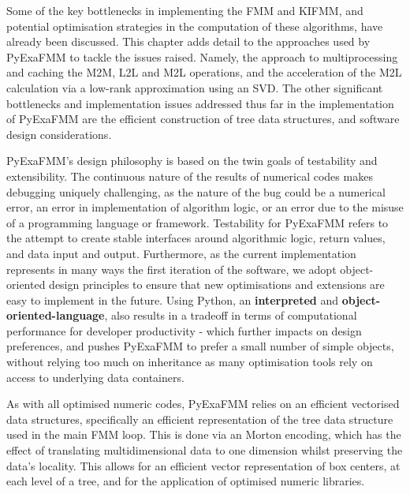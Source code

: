 Some of the key bottlenecks in implementing the \gls{FMM} and \gls{KIFMM}, and potential
optimisation strategies in the computation of these algorithms, have already been
discussed. This chapter adds detail to the approaches used by \gls{PyExaFMM} to tackle
the issues raised. Namely, the approach to multiprocessing and caching the \gls{M2M},
\gls{L2L} and \gls{M2L} operations, and the acceleration of the \gls{M2L} calculation
via a low-rank approximation using an \gls{SVD}. The other significant bottlenecks
and implementation issues addressed thus far in the implementation of \gls{PyExaFMM} are the
efficient construction of tree data structures, and software design considerations.

\gls{PyExaFMM}'s design philosophy is based on the twin goals of testability
and extensibility. The continuous nature of the results of numerical codes makes
debugging uniquely challenging, as the nature of the bug could be a numerical error,
an error in implementation of algorithm logic, or an error due to the misuse of a
programming language or framework. Testability for \gls{PyExaFMM} refers to
the attempt to create stable interfaces around algorithmic logic, return values,
and data input and output. Furthermore, as the current implementation represents
in many ways the first iteration of the software, we adopt object-oriented
design principles to ensure that new optimisations and extensions are easy
to implement in the future. Using Python, an \textbf{\gls{interpreted}} and
\textbf{\gls{object-oriented-language}}, also results in a tradeoff in terms of
computational performance for developer productivity - which further impacts
on design preferences, and pushes \gls{PyExaFMM} to prefer a small number of
simple objects, without relying too much on inheritance as many optimisation tools
rely on access to underlying data containers.

As with all optimised numeric codes, \gls{PyExaFMM} relies on an efficient
vectorised data structures, specifically an efficient representation of the tree
data structure used in the main \gls{FMM} loop. This is done via an Morton encoding,
which has the effect of translating multidimensional data to one dimension whilst
preserving the data's locality. This allows for an efficient vector representation
of box centers, at each level of a tree, and for the application of optimised
numeric libraries.
